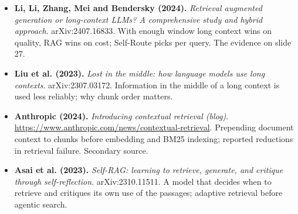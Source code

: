\documentclass[11pt,letterpaper]{article}
\begin{document}
\begin{itemize}[leftmargin=1.2em,itemsep=3pt]
\item \textbf{Li, Li, Zhang, Mei and Bendersky (2024).} \textit{Retrieval augmented generation or long-context LLMs? A comprehensive study and hybrid approach}. arXiv:2407.16833. With enough window long context wins on quality, RAG wins on cost; Self-Route picks per query. The evidence on slide 27.
\item \textbf{Liu et al. (2023).} \textit{Lost in the middle: how language models use long contexts}. arXiv:2307.03172. Information in the middle of a long context is used less reliably; why chunk order matters.
\item \textbf{Anthropic (2024).} \textit{Introducing contextual retrieval (blog)}. \url{https://www.anthropic.com/news/contextual-retrieval}. Prepending document context to chunks before embedding and BM25 indexing; reported reductions in retrieval failure. Secondary source.
\item \textbf{Asai et al. (2023).} \textit{Self-RAG: learning to retrieve, generate, and critique through self-reflection}. arXiv:2310.11511. A model that decides when to retrieve and critiques its own use of the passages; adaptive retrieval before agentic search.
\end{itemize}
\end{document}
